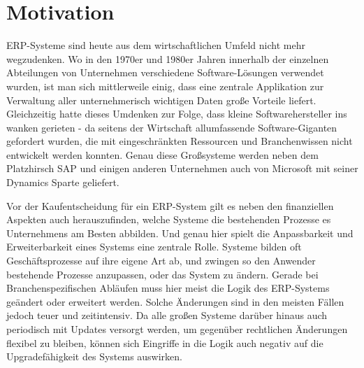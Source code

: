 \chapter{Motivation}
\label{cha:Motivation}

ERP-Systeme sind heute aus dem wirtschaftlichen Umfeld nicht mehr wegzudenken. Wo in den 1970er und 1980er Jahren innerhalb der einzelnen Abteilungen von Unternehmen verschiedene Software-Lösungen verwendet wurden, ist man sich mittlerweile einig, dass eine zentrale Applikation zur Verwaltung aller unternehmerisch wichtigen Daten große Vorteile liefert.
Gleichzeitig hatte dieses Umdenken zur Folge, dass kleine Softwarehersteller ins wanken gerieten - da seitens der Wirtschaft allumfassende Software-Giganten gefordert wurden, die mit eingeschränkten Ressourcen und Branchenwissen nicht entwickelt werden konnten. Genau diese Großsysteme werden neben dem Platzhirsch SAP und einigen anderen Unternehmen auch von Microsoft mit seiner Dynamics Sparte geliefert.

Vor der Kaufentscheidung für ein ERP-System gilt es neben den finanziellen Aspekten auch herauszufinden, welche Systeme die bestehenden Prozesse es Unternehmens am Besten abbilden. Und genau hier spielt die Anpassbarkeit und Erweiterbarkeit eines Systems eine zentrale Rolle. Systeme bilden oft Geschäftsprozesse auf ihre eigene Art ab, und zwingen so den Anwender bestehende Prozesse anzupassen, oder das System zu ändern. Gerade bei Branchenspezifischen Abläufen muss hier meist die Logik des ERP-Systems geändert oder erweitert werden. Solche Änderungen sind in den meisten Fällen jedoch teuer und zeitintensiv. Da alle großen Systeme darüber hinaus auch periodisch mit Updates versorgt werden, um gegenüber rechtlichen Änderungen flexibel zu bleiben, können sich Eingriffe in die Logik auch negativ auf die Upgradefähigkeit des Systems auswirken. 



